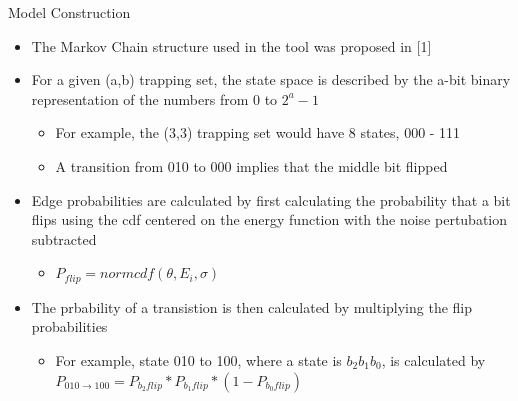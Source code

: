 \documentclass[10pt,ignorenonframetext,]{beamer}
\providecommand{\tightlist}{%
  \setlength{\itemsep}{0pt}\setlength{\parskip}{0pt}}
\begin{document}
\begin{frame}{Model Construction}
\protect\hypertarget{model-construction}{}
\begin{itemize}[<+->]
\tightlist
\item
  The Markov Chain structure used in the tool was proposed in {[}1{]}
\item
  For a given (a,b) trapping set, the state space is described by the
  a-bit binary representation of the numbers from 0 to \(2^a-1\)

  \begin{itemize}[<+->]
  \tightlist
  \item
    For example, the (3,3) trapping set would have 8 states, 000 - 111
  \item
    A transition from 010 to 000 implies that the middle bit flipped
  \end{itemize}
\item
  Edge probabilities are calculated by first calculating the probability
  that a bit flips using the cdf centered on the energy function with
  the noise pertubation subtracted

  \begin{itemize}[<+->]
  \tightlist
  \item
    \(P_{flip} = normcdf(\theta,E_i,\sigma)\)
  \end{itemize}
\item
  The prbability of a transistion is then calculated by multiplying the
  flip probabilities

  \begin{itemize}[<+->]
  \tightlist
  \item
    For example, state 010 to 100, where a state is \(b_2b_1b_0\), is
    calculated by
    \(P_{010\rightarrow 100}=P_{b_2flip}*P_{b_1flip}*(1-P_{b_0flip})\)
  \end{itemize}
\end{itemize}
\end{frame}
\end{document}
